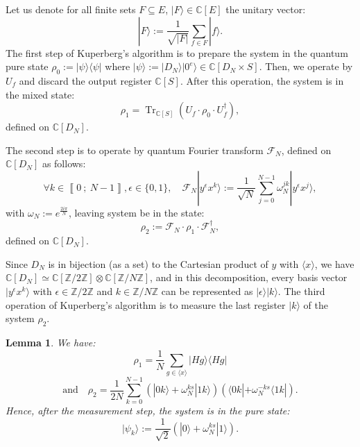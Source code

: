 \documentclass[a4paper,10pt]{report}
\theoremstyle{definition}
\theoremstyle{plain}
\newtheorem{Lemma}[Definition]{Lemma}
\theoremstyle{definition}
\newcommand{\Z}{\mathbb{Z}}
\newcommand{\C}{\mathbb{C}}
\newcommand{\m}[1]{\mathcal{#1}}
\renewcommand{\i}[2]{\left\llbracket #1~;~#2\right\rrbracket}
\renewcommand{\(}{\left(}
\renewcommand{\)}{\right)}
\DeclareMathOperator{\Tr}{Tr}
\begin{document}
Let us denote for all finite sets $F\subseteq E$, $|F\rangle\in\C[E]$ the unitary vector:
\[|F\rangle:=\frac{1}{\sqrt{|F|}}\sum_{f\in F}|f\rangle.\]
The first step of Kuperberg's algorithm is to prepare the system in the quantum pure state $\rho_0:=|\psi\rangle\langle\psi|$ where $|\psi\rangle:=|D_N\rangle|0^e\rangle\in\C[D_N\times S]$.  Then, we operate by $U_f$ and discard the output register $\C[S]$. After this operation, the system is in the mixed state:
\[\rho_1=\Tr_{\C[S]}(U_f\cdot \rho_0\cdot U_f^{\dag}),\]
defined on $\C[D_N]$.  

The second step is to operate by quantum Fourier transform $\m{F}_N$, defined on $\C[D_N]$ as follows:
\[\forall k\in\i{0}{N-1}, \epsilon\in\{0,1\}, \quad \m{F}_N|y^\epsilon x^k\rangle:=\frac{1}{\sqrt{N}}\sum_{j=0}^{N-1}\omega_N^{jk}|y^\epsilon x^j\rangle,\]
with $\omega_N:=e^{\frac{2i\pi}{N}}$, leaving system be in the state:
\[\rho_2:=\m{F}_N\cdot \rho_1\cdot \m{F}_N^{\dag},\]
defined on $\C[D_N]$.

Since $D_N$ is in bijection (as a set) to the Cartesian product of $y$ with $\langle x\rangle$, we have $\C[D_N]\simeq\C[\Z/2\Z]\otimes\C[\Z/N\Z]$, and in this decomposition, every basis vector $|y^\epsilon x^k\rangle$ with $\epsilon\in\Z/2\Z$ and $k\in\Z/N\Z$ can be represented as $|\epsilon\rangle|k\rangle$. The third operation of Kuperberg's algorithm is to measure the last register $|k\rangle$ of the system $\rho_2$.

\begin{Lemma}
We have:
\[\rho_1=\frac{1}{N}\sum_{g\in \langle x\rangle}|Hg\rangle\langle Hg|\]
\[\mbox{and} \quad \rho_2=\frac{1}{2N}\sum_{k=0}^{N-1}(|0k\rangle +\omega_N^{ks}|1k\rangle)(\langle 0k|+\omega_N^{-ks}\langle 1k|).\]
Hence, after the measurement step, the system is in the pure state:
\[|\psi_k\rangle:=\frac{1}{\sqrt{2}}(|0\rangle +\omega_N^{ks}|1\rangle).\]
\end{Lemma}
\end{document}
